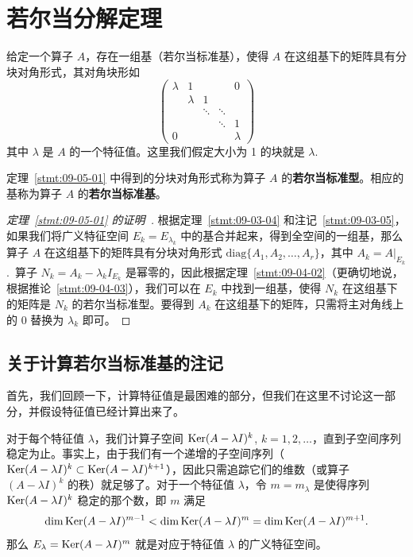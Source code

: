 \section{若尔当分解定理}\label{sec:09-05}

\begin{theorem}\label{stmt:09-05-01}  给定一个算子 $A$，存在一组基（若尔当标准基），使得 $A$ 在这组基下的矩阵具有分块对角形式，其对角块形如
\begin{equation}\label{eq:09-05-01}
\begin{pmatrix}
\lambda & 1 & & & 0 \\
& \lambda & 1 & & \\
& & \ddots & \ddots & \\
& & & \ddots & 1 \\
0 & & & & \lambda
\end{pmatrix}
\end{equation}
其中 $\lambda$ 是 $A$ 的一个特征值。这里我们假定大小为 1 的块就是 $\lambda$.~\end{theorem}

定理~\ref{stmt:09-05-01} 中得到的分块对角形式称为算子 $A$ 的\textbf{若尔当标准型}。相应的基称为算子 $A$ 的\textbf{若尔当标准基}。

\begin{proof}[\normalfont\heiti 定理~\ref{stmt:09-05-01} 的证明~\nopunct]根据定理~\ref{stmt:09-03-04} 和注记~\ref{stmt:09-03-05}，如果我们将广义特征空间 $E_k = E_{\lambda_k}$ 中的基合并起来，得到全空间的一组基，那么算子 $A$ 在这组基下的矩阵具有分块对角形式 $\mathrm{diag}\{A_1, A_2, \dots, A_r\}$，其中 $A_k = A|_{E_k}$.~算子 $N_k = A_k - \lambda_k I_{E_k}$ 是幂零的，因此根据定理~\ref{stmt:09-04-02}（更确切地说，根据推论~\ref{stmt:09-04-03}），我们可以在 $E_k$ 中找到一组基，使得 $N_k$ 在这组基下的矩阵是 $N_k$ 的若尔当标准型。要得到 $A_k$ 在这组基下的矩阵，只需将主对角线上的 0 替换为 $\lambda_k$ 即可。\end{proof}

\subsection{关于计算若尔当标准基的注记}\label{sec:09-05-01}
首先，我们回顾一下，计算特征值是最困难的部分，但我们在这里不讨论这一部分，并假设特征值已经计算出来了。

对于每个特征值 $\lambda$，我们计算子空间 $\operatorname{Ker}(A-\lambda I)^k$, $k=1,2, \dots$，直到子空间序列稳定为止。事实上，由于我们有一个递增的子空间序列（$\operatorname{Ker}(A-\lambda I)^k \subset \operatorname{Ker}(A-\lambda I)^{k+1}$），因此只需追踪它们的维数（或算子 $(A-\lambda I)^k$ 的秩）就足够了。对于一个特征值 $\lambda$，令 $m=m_\lambda$ 是使得序列 $\operatorname{Ker}(A-\lambda I)^k$ 稳定的那个数，即 $m$ 满足
\[
\dim\operatorname{Ker}(A - \lambda I)^{m-1} < \dim \operatorname{Ker}(A - \lambda I)^m = \dim \operatorname{Ker}(A - \lambda I)^{m+1}.
\]
那么 $E_\lambda = \operatorname{Ker}(A-\lambda I)^m$ 就是对应于特征值 $\lambda$ 的广义特征空间。

